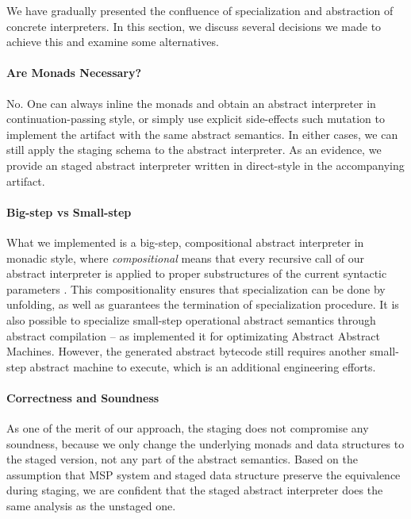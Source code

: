 We have gradually presented the confluence of specialization and abstraction of
concrete interpreters. In this section, we discuss several decisions we made to
achieve this and examine some alternatives.

\paragraph{Are Monads Necessary?} No. One can always inline the monads and
obtain an abstract interpreter in continuation-passing style, or simply use
explicit side-effects such mutation to implement the artifact with the same
abstract semantics. In either cases, we can still apply the staging schema to
the abstract interpreter. As an evidence, we provide an staged abstract
interpreter written in direct-style in the accompanying artifact.

\paragraph{Big-step vs Small-step}

What we implemented is a big-step, compositional abstract interpreter in monadic
style, where \textit{compositional} means that every recursive call of our abstract
interpreter is applied to proper substructures of the current syntactic
parameters \cite{10.1007/3-540-61580-6_11}. This compositionality ensures that
specialization can be done by unfolding, as well as guarantees the termination
of specialization procedure. It is also possible to specialize small-step
operational abstract semantics through abstract compilation
\cite{Boucher:1996:ACN:647473.727587} -- as
\citet{Johnson:2013:OAA:2500365.2500604} implemented it for
optimizating Abstract Abstract Machines. However, the generated abstract
bytecode still requires another small-step abstract machine to execute, which is
an additional engineering efforts.


\paragraph{Correctness and Soundness}

As one of the merit of our approach, the staging does not compromise any
soundness, because we only change the underlying monads and data structures to
the staged version, not any part of the abstract semantics. Based on the
assumption that MSP system and staged data structure preserve the equivalence
during staging, we are confident that the staged abstract interpreter does the
same analysis as the unstaged one.

